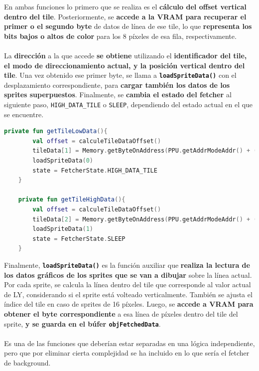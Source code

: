 En ambas funciones lo primero que se realiza es el \textbf{cálculo del offset vertical dentro del tile}. Posteriormente, se \textbf{accede a la VRAM para recuperar el primer o el segundo byte} de datos de línea de ese tile, lo que \textbf{representa los bits bajos o altos de color} para los 8 píxeles de esa fila, respectivamente.
\\\\
La \textbf{dirección} a la que accede \textbf{se obtiene} utilizando el \textbf{identificador del tile, el modo de direccionamiento actual, y la posición vertical dentro del tile}. Una vez obtenido ese primer byte, se llama a \textbf{\texttt{loadSpriteData()}} con el desplazamiento correspondiente, para \textbf{cargar también los datos de los sprites superpuestos}. Finalmente, se \textbf{cambia el estado del fetcher} al siguiente paso, \texttt{HIGH\_DATA\_TILE} o \texttt{SLEEP}, dependiendo del estado actual en el que se encuentre.

\begin{lstlisting}[language=Kotlin, caption={FIFO Fetcher - Obtención de los Bits Bajos o Altos del Tile.}, label={code:ppufifogethighlowdata}]
    private fun getTileLowData(){
        val offset = calculeTileDataOffset()
        tileData[1] = Memory.getByteOnAddress(PPU.getAddrModeAddr() + ((tileData[0].toInt() and 0xFF) * 16) + offset)
        loadSpriteData(0)
        state = FetcherState.HIGH_DATA_TILE
    }

    private fun getTileHighData(){
        val offset = calculeTileDataOffset()
        tileData[2] = Memory.getByteOnAddress(PPU.getAddrModeAddr() + ((tileData[0].toInt() and 0xFF) * 16) + (offset + 1))
        loadSpriteData(1)
        state = FetcherState.SLEEP
    }
\end{lstlisting}

Finalmente, \textbf{\texttt{loadSpriteData()}} es la función auxiliar que \textbf{realiza la lectura de los datos gráficos de los sprites que se van a dibujar} sobre la línea actual. Por cada sprite, se calcula la línea dentro del tile que corresponde al valor actual de LY, considerando si el sprite está volteado verticalmente. También se ajusta el índice del tile en caso de sprites de 16 píxeles. Luego, se \textbf{accede a VRAM para obtener el byte correspondiente} a esa línea de píxeles dentro del tile del sprite, \textbf{y se guarda en el búfer \texttt{objFetchedData}}.
\\\\
Es una de las funciones que deberían estar separadas en una lógica independiente, pero que por eliminar cierta complejidad se ha incluido en lo que sería el fetcher de background.


